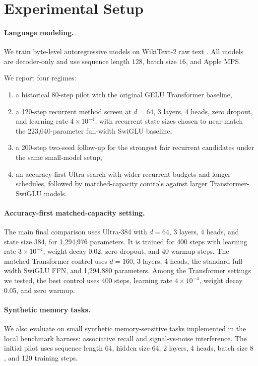 \documentclass[11pt]{article}
\begin{document}
\section{Experimental Setup}
\paragraph{Language modeling.}
We train byte-level autoregressive models on WikiText-2 raw text
\citep{merity2017pointer}. All models are decoder-only and use sequence length
$128$, batch size $16$, and Apple MPS.

We report four regimes:
\begin{enumerate}[leftmargin=1.25em]
  \item a historical 80-step pilot with the original GELU Transformer baseline,
  \item a 120-step recurrent method screen at $d=64$, 3 layers, 4 heads, zero
  dropout, and learning rate $4 \times 10^{-4}$, with recurrent state sizes
  chosen to near-match the 223,040-parameter full-width SwiGLU baseline,
  \item a 200-step two-seed follow-up for the strongest fair recurrent
  candidates under the same small-model setup,
  \item an accuracy-first Ultra search with wider recurrent budgets and longer
  schedules, followed by matched-capacity controls against larger
  Transformer-SwiGLU models.
\end{enumerate}

\paragraph{Accuracy-first matched-capacity setting.}
The main final comparison uses Ultra-384 with $d=64$, 3 layers, 4 heads, and
state size 384, for 1,294,976 parameters. It is trained for 400 steps with
learning rate $3 \times 10^{-4}$, weight decay 0.02, zero dropout, and 40
warmup steps. The matched Transformer control uses $d=160$, 3 layers, 4 heads,
the standard full-width SwiGLU FFN, and 1,294,880 parameters. Among the
Transformer settings we tested, the best control uses 400 steps, learning rate
$4 \times 10^{-4}$, weight decay 0.05, and zero warmup.

\paragraph{Synthetic memory tasks.}
We also evaluate on small synthetic memory-sensitive tasks implemented in the
local benchmark harness: associative recall and signal-vs-noise interference.
The initial pilot uses sequence length $64$, hidden size $64$, 2 layers,
4 heads, batch size $8$, and 120 training steps.
\end{document}
